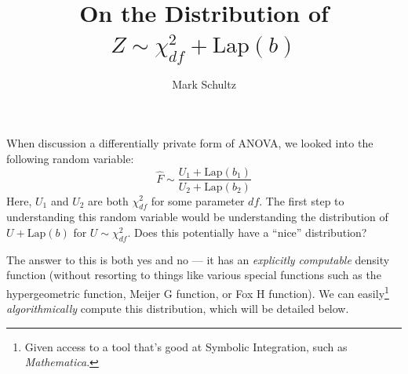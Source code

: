 \documentclass{article}
\begin{document}
\title{On the Distribution of $Z\sim\chi^2_{df} + \text{Lap}(b)$}
\author{Mark Schultz}
\maketitle

When discussion a differentially private form of ANOVA, we looked into the following random variable:
\begin{equation}
\widehat{F}\sim \frac{U_1+\text{Lap}(b_1)}{U_2+\text{Lap}(b_2)}
\end{equation}
Here, $U_1$ and $U_2$ are both $\chi^2_{df}$ for some parameter $df$.
The first step to understanding this random variable would be understanding the distribution of $U+\text{Lap}(b)$ for $U\sim\chi^2_{df}$.
Does this potentially have a ``nice'' distribution?

The answer to this is both yes and no --- it has an \emph{explicitly computable} density function (without resorting to things like various special functions such as the hypergeometric function, Meijer G function, or Fox H function).
We can easily\footnote{Given access to a tool that's good at Symbolic Integration, such as \emph{Mathematica}.} \emph{algorithmically} compute this distribution, which will be detailed below.
\end{document}
